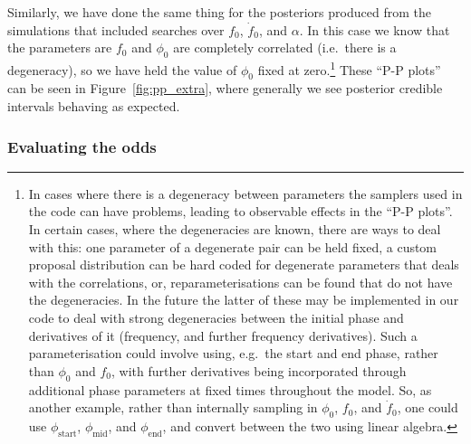 Similarly, we have done the same thing for the posteriors produced from the simulations that included searches over $f_0$, $\dot{f}_0$, and $\alpha$. 
In this case we know that the parameters are $f_0$ and $\phi_0$ are completely correlated (i.e.\ there is a degeneracy), so we have held the value of $\phi_0$
fixed at zero.\footnote{In cases where there is a degeneracy between parameters the samplers used in the code can have problems, leading to observable effects in
the ``P-P plots''. In certain cases, where the degeneracies are known, there are ways to deal with this: one parameter of a degenerate pair can be held fixed,
a custom proposal distribution can be hard coded for degenerate parameters that deals with the correlations, or, reparameterisations can be found that do not
have the degeneracies. In the future the latter of these may be implemented in our code to deal with strong degeneracies between the initial phase and derivatives of it
(frequency, and further frequency derivatives). Such a parameterisation could involve using, e.g.\ the start and end phase, rather than $\phi_0$ and $f_0$,
with further derivatives being incorporated through additional phase parameters at fixed times throughout the model. So, as another example, rather than
internally sampling in $\phi_0$, $f_0$, and $\dot{f}_0$, one could use $\phi_{\text{start}}$, $\phi_{\text{mid}}$, and $\phi_{\text{end}}$, and convert between
the two using linear algebra.} These ``P-P plots'' can be seen in Figure~\ref{fig:pp_extra}, where generally we see posterior credible intervals behaving as
expected.

\subsubsection{Evaluating the odds}\label{sec:evalodds}

